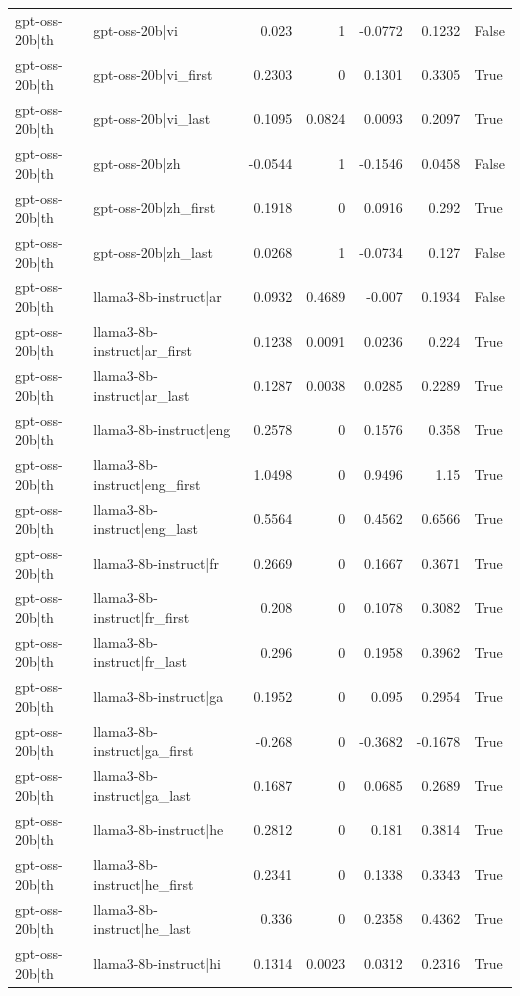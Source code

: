 \begin{table}
\begin{tabular}{l l r r r r l}
gpt-oss-20b|th & gpt-oss-20b|vi & 0.023 & 1 & -0.0772 & 0.1232 & False \\
gpt-oss-20b|th & gpt-oss-20b|vi_first & 0.2303 & 0 & 0.1301 & 0.3305 & True \\
gpt-oss-20b|th & gpt-oss-20b|vi_last & 0.1095 & 0.0824 & 0.0093 & 0.2097 & True \\
gpt-oss-20b|th & gpt-oss-20b|zh & -0.0544 & 1 & -0.1546 & 0.0458 & False \\
gpt-oss-20b|th & gpt-oss-20b|zh_first & 0.1918 & 0 & 0.0916 & 0.292 & True \\
gpt-oss-20b|th & gpt-oss-20b|zh_last & 0.0268 & 1 & -0.0734 & 0.127 & False \\
gpt-oss-20b|th & llama3-8b-instruct|ar & 0.0932 & 0.4689 & -0.007 & 0.1934 & False \\
gpt-oss-20b|th & llama3-8b-instruct|ar_first & 0.1238 & 0.0091 & 0.0236 & 0.224 & True \\
gpt-oss-20b|th & llama3-8b-instruct|ar_last & 0.1287 & 0.0038 & 0.0285 & 0.2289 & True \\
gpt-oss-20b|th & llama3-8b-instruct|eng & 0.2578 & 0 & 0.1576 & 0.358 & True \\
gpt-oss-20b|th & llama3-8b-instruct|eng_first & 1.0498 & 0 & 0.9496 & 1.15 & True \\
gpt-oss-20b|th & llama3-8b-instruct|eng_last & 0.5564 & 0 & 0.4562 & 0.6566 & True \\
gpt-oss-20b|th & llama3-8b-instruct|fr & 0.2669 & 0 & 0.1667 & 0.3671 & True \\
gpt-oss-20b|th & llama3-8b-instruct|fr_first & 0.208 & 0 & 0.1078 & 0.3082 & True \\
gpt-oss-20b|th & llama3-8b-instruct|fr_last & 0.296 & 0 & 0.1958 & 0.3962 & True \\
gpt-oss-20b|th & llama3-8b-instruct|ga & 0.1952 & 0 & 0.095 & 0.2954 & True \\
gpt-oss-20b|th & llama3-8b-instruct|ga_first & -0.268 & 0 & -0.3682 & -0.1678 & True \\
gpt-oss-20b|th & llama3-8b-instruct|ga_last & 0.1687 & 0 & 0.0685 & 0.2689 & True \\
gpt-oss-20b|th & llama3-8b-instruct|he & 0.2812 & 0 & 0.181 & 0.3814 & True \\
gpt-oss-20b|th & llama3-8b-instruct|he_first & 0.2341 & 0 & 0.1338 & 0.3343 & True \\
gpt-oss-20b|th & llama3-8b-instruct|he_last & 0.336 & 0 & 0.2358 & 0.4362 & True \\
gpt-oss-20b|th & llama3-8b-instruct|hi & 0.1314 & 0.0023 & 0.0312 & 0.2316 & True \\

\end{tabular}
\end{table}
